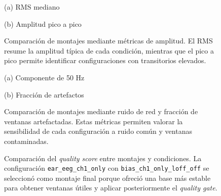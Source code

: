 \documentclass[../main.tex]{subfiles}
\begin{document}
\begin{figure}[H]
    \centering
    \begin{minipage}{0.90\textwidth}
        \centering
        \small (a) RMS mediano
    \end{minipage}
    \hfill
    \begin{minipage}{0.90\textwidth}
        \centering
        \small (b) Amplitud pico a pico
    \end{minipage}
    \caption{Comparación de montajes mediante métricas de amplitud. El RMS resume la amplitud típica de cada condición, mientras que el pico a pico permite identificar configuraciones con transitorios elevados.}
    \label{fig:validacion_montaje_amplitud}
\end{figure}

\begin{figure}[htbp]
    \centering
    \begin{minipage}{0.49\textwidth}
        \centering
        \small (a) Componente de 50 Hz
    \end{minipage}
    \hfill
    \begin{minipage}{0.49\textwidth}
        \centering
        \small (b) Fracción de artefactos
    \end{minipage}
    \caption{Comparación de montajes mediante ruido de red y fracción de ventanas artefactadas. Estas métricas permiten valorar la sensibilidad de cada configuración a ruido común y ventanas contaminadas.}
    \label{fig:validacion_montaje_ruido_artefactos}
\end{figure}

\begin{figure}[htbp]
    \centering
    \caption{Comparación del \textit{quality score} entre montajes y condiciones. La configuración \texttt{ear\_eeg\_ch1\_only} con \texttt{bias\_ch1\_only\_loff\_off} se seleccionó como montaje final porque ofreció una base más estable para obtener ventanas útiles y aplicar posteriormente el \textit{quality gate}.}
    \label{fig:validacion_montaje_quality_score}
\end{figure}
\end{document}
